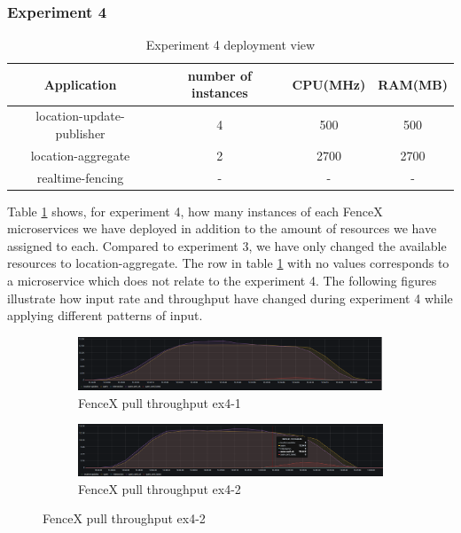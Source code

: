 \documentclass[a4]{report}
\begin{document}
    \subsubsection{Experiment 4}
    \begin{table}[h!]
        \centering
        \begin{tabular}{|c|c|c|c|}
            \hline
            Application               & number of instances & CPU(MHz) & RAM(MB) \\
            \hline
            location-update-publisher & 4                   & 500      & 500     \\
            location-aggregate        & 2                   & 2700     & 2700    \\
            realtime-fencing          & -                   & -        & -       \\
            \hline
        \end{tabular}
        \caption{Experiment 4 deployment view}
        \label{table:ex4-dv}
    \end{table}

    Table \ref{table:ex4-dv} shows, for experiment 4, how many instances of each FenceX microservices we have
    deployed in addition to the amount of resources we have assigned to each.
    Compared to experiment 3, we have only changed the available resources to location-aggregate.
    The row in table \ref{table:ex4-dv} with no values corresponds to a microservice which does not relate to the
    experiment 4.
    The following figures illustrate how input rate and throughput have changed during experiment 4 while applying
    different patterns of input.

    \begin{figure}
        \centering
        \begin{subfigure}[b]{\textwidth}
            \centering
            \caption{FenceX pull throughput ex4-1}
            \label{fig:ex4-1}
            \includegraphics[width=\textwidth, height=0.3\textheight, scale=2]{images/evaluation/ex4-benchmarking(19,10).png}
        \end{subfigure}

        \begin{subfigure}[b]{\textwidth}
            \centering
            \caption{FenceX pull throughput ex4-2}
            \label{fig:ex4-2}
            \includegraphics[width=\textwidth, height=0.3\textheight, scale=2]{images/evaluation/ex4-benchmarking(22,10).png}
        \end{subfigure}
    \end{figure}
\end{document}
